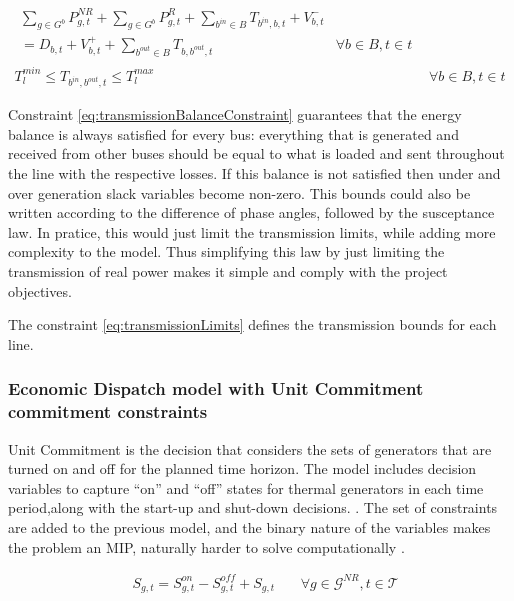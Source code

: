 \documentclass[12pt,LUDisStyle,twosided]{book}
\newcommand{\mc}{\mathcal}
\begin{document}
\begin{subequations}\label{model:edTransmissionConstraints}
\begin{align}
\begin{split}
\sum_{g \in G^{b}} P^{NR}_{g,t} + \sum_{g \in G^{b}} P^{R}_{g,t} + \sum_{b^{in} \in B} T_{b^{in},b,t} + V^{-}_{b,t} &
\\ = D_{b,t}  + V^{+}_{b,t} + \sum_{b^{out} \in B} T_{b,b^{out},t}  &\forall b \in B, t \in t \label{eq:transmissionBalanceConstraint}
\end{split}
\\ T^{min}_{l} \leq T_{b^{in},b^{out},t} \leq T^{max}_{l} & \forall b \in B, t \in t \label{eq:transmissionLimits}
\end{align} 
\end{subequations}

Constraint \eqref{eq:transmissionBalanceConstraint} guarantees that the energy balance is always satisfied for every bus: everything that is generated and received from other buses should be equal to what is loaded and sent throughout the line with the respective losses. If this balance is not satisfied then under and over generation slack variables become non-zero. This bounds could also be written according to the difference of phase angles, followed by the susceptance law. In pratice, this would just limit the transmission limits, while adding more complexity to the model. Thus simplifying this law by just limiting the transmission of real power makes it simple and comply with the project objectives.

The constraint \eqref{eq:transmissionLimits} defines the transmission bounds for each line.

\subsubsection{Economic Dispatch model with Unit Commitment commitment constraints}
Unit Commitment is the decision that considers the sets of generators that are turned on and off for the planned time horizon. The model includes decision variables to capture ``on'' and ``off'' states for thermal generators in each time period,along with the start-up and shut-down decisions. \citep{palmintier}. The set of constraints are added to the previous model, and the binary nature of the variables makes the problem an MIP, naturally harder to solve computationally \cite{james}. 

\begin{subequations}\label{model:ucConstraints}
\begin{alignat}{4}
& S_{g,t} = S^{on}_{g,t} - S^{off}_{g,t} + S_{g,t}  &~& \forall g \in \mc{G}^{NR} , t \in \mc{T} \label{eq:logconst}\end{alignat} 
\end{subequations}
\end{document}
